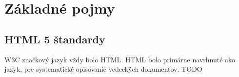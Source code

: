 \chapter{Základné pojmy}




\section{\acs{HTML} 5 štandardy}

\ac*{W3C} značkový jazyk vždy bolo \acs{HTML}. 
HTML bolo primárne navrhnuté ako jazyk, pre systematické opisovanie vedeckých dokumentov.  
TODO









